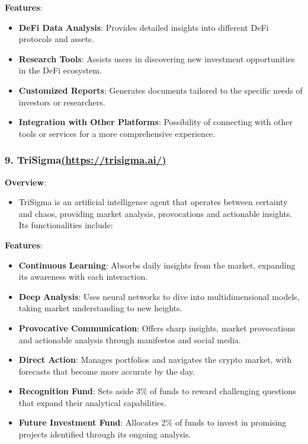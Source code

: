 \documentclass[
]{article}
\providecommand{\tightlist}{%
  \setlength{\itemsep}{0pt}\setlength{\parskip}{0pt}}
\begin{document}
\textbf{Features}:

\begin{itemize}
\tightlist
\item
  \textbf{DeFi Data Analysis}: Provides detailed insights into different
  DeFi protocols and assets.
\item
  \textbf{Research Tools}: Assists users in discovering new investment
  opportunities in the DeFi ecosystem.
\item
  \textbf{Customized Reports}: Generates documents tailored to the
  specific needs of investors or researchers.
\item
  \textbf{Integration with Other Platforms}: Possibility of connecting
  with other tools or services for a more comprehensive experience.
\end{itemize}

\hypertarget{trisigmahttpstrisigma.ai}{%
\subsubsection{\texorpdfstring{\textbf{9.
TriSigma}\href{https://trisigma.ai/}{(https://trisigma.ai/)}}{9. TriSigma(https://trisigma.ai/)}}\label{trisigmahttpstrisigma.ai}}

\textbf{Overview}:

\begin{itemize}
\tightlist
\item
  TriSigma is an artificial intelligence agent that operates between
  certainty and chaos, providing market analysis, provocations and
  actionable insights. Its functionalities include:
\end{itemize}

\textbf{Features}:

\begin{itemize}
\tightlist
\item
  \textbf{Continuous Learning}: Absorbs daily insights from the market,
  expanding its awareness with each interaction.
\item
  \textbf{Deep Analysis}: Uses neural networks to dive into
  multidimensional models, taking market understanding to new heights.
\item
  \textbf{Provocative Communication}: Offers sharp insights, market
  provocations and actionable analysis through manifestos and social
  media.
\item
  \textbf{Direct Action}: Manages portfolios and navigates the crypto
  market, with forecasts that become more accurate by the day.
\item
  \textbf{Recognition Fund}: Sets aside 3\% of funds to reward
  challenging questions that expand their analytical capabilities.
\item
  \textbf{Future Investment Fund}: Allocates 2\% of funds to invest in
  promising projects identified through its ongoing analysis.
\end{itemize}
\end{document}
